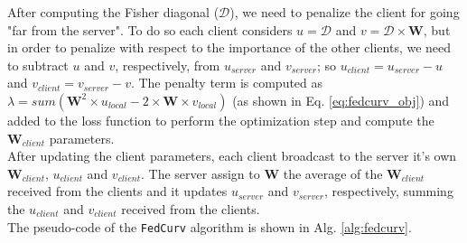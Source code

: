 After computing the Fisher diagonal ($\mathcal{D}$), we need to penalize the client for going "far from the server". To do so each client considers $u=\mathcal{D}$ and $v=\mathcal{D}\times \textbf{W}$, but in order to penalize with respect to the importance of the other clients, we need to subtract $u$ and $v$, respectively, from $u_{server}$ and $v_{server}$; so $u_{client}=u_{server}-u$ and $v_{client}=v_{server}-v$. The penalty term is computed as $\lambda= sum(\textbf{W}^2\times u_{local}-2\times \textbf{W}\times v_{local})$ (as shown in Eq. \ref{eq:fedcurv_obj}) and added to the loss function to perform the optimization step and compute the $\textbf{W}_{client}$ parameters.  \\

After updating the client parameters, each client broadcast to the server it's own  $\textbf{W}_{client}$, $u_{client}$ and $v_{client}$. The server assign to \textbf{W} the average of the $\textbf{W}_{client}$ received from the clients and it updates $u_{server}$ and $v_{server}$, respectively, summing the $u_{client}$ and $v_{client}$ received from the clients. \\

The pseudo-code of the \texttt{FedCurv} algorithm is shown in Alg. \ref{alg:fedcurv}. \\


